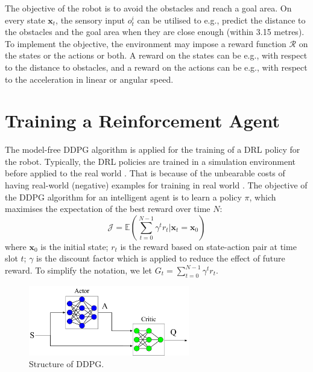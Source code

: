 \begin{example}
The objective of the robot is to avoid the obstacles and reach a goal area. On every state $\textbf{x}_t$, the sensory input $o^i_t$ can be utilised to e.g., predict the distance to the obstacles and the goal area when they are close enough (within 3.15 metres). To implement the objective, the environment may impose a reward function $\mathcal{R}$ on the states or the actions or both. A reward on the states can be e.g., with respect to the distance to obstacles, and a reward on the actions can be e.g., with respect to the acceleration in linear or angular speed. 
\end{example}





\section{Training a Reinforcement Agent}

The model-free
DDPG algorithm \cite{lillicrap2015continuous} is applied for the training of a DRL policy for the robot. Typically, the DRL policies are 
trained in a simulation environment before applied to the real world \cite{christiano2016transfer}. That is because of the unbearable costs of having real-world (negative) examples for training in real world \cite{yu2018towards}. 
The objective of the DDPG algorithm for an intelligent agent is to learn a policy $\pi$, which maximises the expectation of the best reward over time $N$:
	\begin{equation}
		\mathcal{J} = \mathbb{E}(\sum_{t=0}^{N-1}\gamma^tr_{t}| \textbf{x}_t = \textbf{x}_0)
	\end{equation}
where $\textbf{x}_0$ is the initial state; $r_t$ is the reward based on state-action pair at time slot $t$; $\gamma$ is the discount factor which is applied to reduce the effect of future reward. To simplify the notation, we let $G_t = \sum_{t=0}^{N-1}\gamma^tr_{t}$.

\begin{figure}[htbp]
\centerline{\includegraphics[width=7cm]{images/LookFurther/DDPG.pdf}}
\caption{Structure of DDPG.}
\label{ddpg}
\end{figure}

